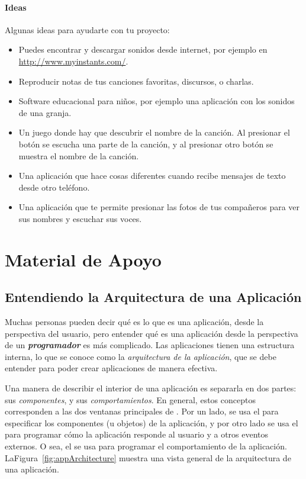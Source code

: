 \paragraph{Ideas} Algunas ideas para ayudarte con tu proyecto:

\begin{itemize}

\item Puedes encontrar y descargar sonidos desde internet, por ejemplo en \url{http://www.myinstants.com/}.

\item Reproducir notas de tus canciones favoritas, discursos, o charlas.

\item Software educacional para niños, por ejemplo una aplicación con los sonidos de una granja.

\item Un juego donde hay que descubrir el nombre de la canción. Al presionar el botón se escucha una parte de la canción, y al presionar otro botón se muestra el nombre de la canción.

\item Una aplicación que hace cosas diferentes cuando recibe mensajes de texto desde otro teléfono.

\item Una aplicación que te permite presionar las fotos de tus compañeros para ver sus nombres y escuchar sus voces.

\end{itemize}

\section{Material de Apoyo}
\label{sec:material-de-apoyo}

\subsection*{Entendiendo la Arquitectura de una Aplicación}

Muchas personas pueden decir qué es lo que es una aplicación, desde la perspectiva del usuario, pero entender qué es una aplicación desde la perspectiva de un \textit{\textbf{programador}} es más complicado. Las aplicaciones tienen una estructura interna, lo que se conoce como la \emph{arquitectura de la aplicación}, que se debe entender para poder crear aplicaciones de manera efectiva.

Una manera de describir el interior de una aplicación es separarla en dos partes: sus \emph{componentes}, y sus \emph{comportamientos}. En general, estos conceptos corresponden a las dos ventanas principales de \AppInventor. Por un lado, se usa el \componentDesigner para especificar los componentes (u objetos) de la aplicación, y por otro lado se usa el \blockEditor para programar cómo la aplicación responde al usuario y a otros eventos externos. O sea, el \blockEditor se usa para programar el comportamiento de la aplicación. LaFigura~\ref{fig:appArchitecture} muestra una vista general de la arquitectura de una aplicación.

